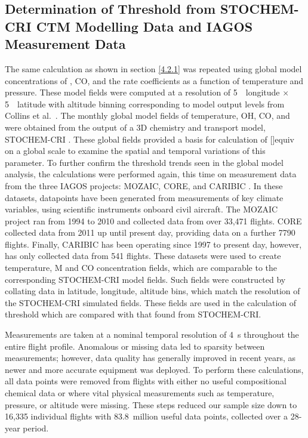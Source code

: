 \subsection{Determination of Threshold \texorpdfstring{}{NOx} from STOCHEM-CRI CTM Modelling Data and IAGOS Measurement Data}
\label{4.2.2}
The same calculation as shown in section \ref{4.2.1} was repeated using global model concentrations of , CO, and the rate coefficients as a function of temperature and pressure. These model fields were computed at a resolution of 5~\textdegree~longitude $\times$ 5~\textdegree~latitude with altitude binning corresponding to model output levels from Collins et al.~\cite{Collins1997}. The monthly global model fields of temperature, OH, CO, and  were obtained from the output of a 3D chemistry and transport model, STOCHEM-CRI \cite{Fuglestvedt1999}. These global fields provided a basis for calculation of []equiv on a global scale to examine the spatial and temporal variations of this parameter. To further confirm the  threshold trends seen in the global model analysis, the calculations were performed again, this time on measurement data from the three IAGOS projects: MOZAIC, CORE, and CARIBIC \cite{Blot2021}. In these datasets, datapoints have been generated from measurements of key climate variables, using scientific instruments onboard civil aircraft. The MOZAIC project ran from 1994 to 2010 and collected data from over 33,471 flights. CORE collected data from 2011 up until present day, providing data on a further 7790 flights. Finally, CARIBIC has been operating since 1997 to present day, however, has only collected data from 541 flights. These datasets were used to create temperature, M and CO concentration fields, which are comparable to the corresponding STOCHEM-CRI model fields. Such fields were constructed by collating data in latitude, longitude, altitude bins, which match the resolution of the STOCHEM-CRI simulated fields. These fields are used in the calculation of  threshold which are compared with that found from STOCHEM-CRI.

Measurements are taken at a nominal temporal resolution of 4~s throughout the entire flight profile. Anomalous or missing data led to sparsity between measurements; however, data quality has generally improved in recent years, as newer and more accurate equipment was deployed. To perform these calculations, all data points were removed from flights with either no useful compositional chemical data or where vital physical measurements such as temperature, pressure, or altitude were missing. These steps reduced our sample size down to 16,335 individual flights with 83.8~million useful data points, collected over a 28-year period.

